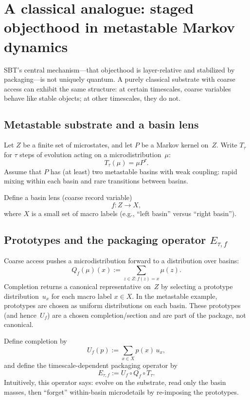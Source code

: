 \section{A classical analogue: staged objecthood in metastable Markov dynamics}\label{sec:markov}

SBT's central mechanism---that objecthood is layer-relative and stabilized by packaging---is not uniquely quantum.
A purely classical substrate with coarse access can exhibit the same structure: at certain timescales, coarse variables behave like stable objects; at other timescales, they do not.

\subsection{Metastable substrate and a basin lens}

Let $Z$ be a finite set of microstates, and let $P$ be a Markov kernel on~$Z$.\cite{Norris1997}
Write $T_\tau$ for $\tau$ steps of evolution acting on a microdistribution~$\mu$:
\[
T_\tau(\mu) = \mu P^\tau.
\]
Assume that $P$ has (at least) two metastable basins with weak coupling: rapid mixing within each basin and rare transitions between basins.

Define a basin lens (coarse record variable)
\[
f : Z \to X,
\]
where $X$ is a small set of macro labels (e.g., ``left basin'' versus ``right basin'').

\subsection{Prototypes and the packaging operator $E_{\tau,f}$}

Coarse access pushes a microdistribution forward to a distribution over basins:
\[
Q_f(\mu)(x) := \sum_{z\in Z: f(z)=x} \mu(z).
\]
Completion returns a canonical representative on~$Z$ by selecting a prototype distribution~$u_x$ for each macro label $x\in X$.
In the metastable example, prototypes are chosen as uniform distributions on each basin.
These prototypes (and hence~$U_f$) are a chosen completion/section and are part of the package, not canonical.

Define completion by
\[
U_f(p) := \sum_{x\in X} p(x)\,u_x,
\]
and define the timescale-dependent packaging operator by
\[
E_{\tau,f} := U_f \circ Q_f \circ T_\tau.
\]
Intuitively, this operator says: evolve on the substrate, read only the basin masses, then ``forget'' within-basin microdetails by re-imposing the prototypes.

